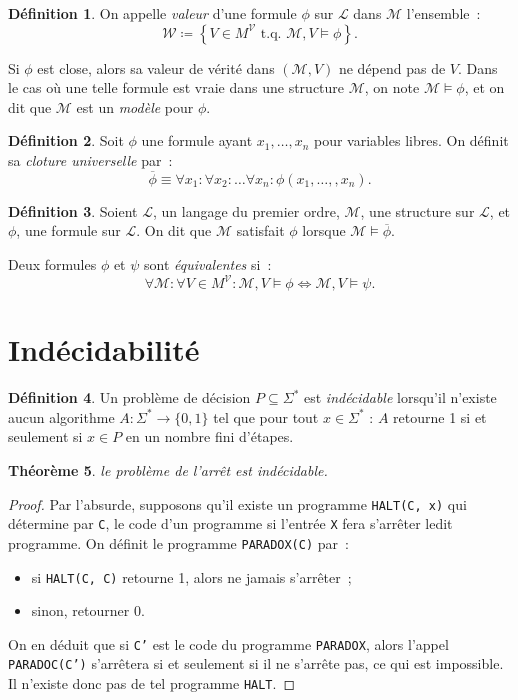 \documentclass{article}
\newtheorem{thm}{Théorème}[section]
\theoremstyle{definition}
\newtheorem{déf}[thm]{Définition}
\theoremstyle{remark}
\newcommand{\tq}{\text{ t.q. }}
\begin{document}
	\begin{déf} On appelle \textit{valeur} d'une formule $\phi$ sur $\mathcal L$ dans $\mathcal M$ l'ensemble~:
	\[\mathcal W \coloneqq \left\{V \in M^{\mathcal V} \tq \mathcal M,V \models \phi\right\}.\]
	\end{déf}

	Si $\phi$ est close, alors sa valeur de vérité dans $(\mathcal M, V)$ ne dépend pas de $V$. Dans le cas où une telle formule est vraie dans
	une structure $\mathcal M$, on note $\mathcal M \models \phi$, et on dit que $\mathcal M$ est un \textit{modèle} pour $\phi$.

	\begin{déf} Soit $\phi$ une formule ayant $x_1, \ldots, x_n$ pour variables libres. On définit sa \textit{cloture universelle} par~:
	\[\overline \phi \equiv \forall x_1 : \forall x_2 : \ldots \forall x_n : \phi(x_1, \ldots, ,x_n).\]
	\end{déf}

	\begin{déf} Soient $\mathcal L$, un langage du premier ordre, $\mathcal M$, une structure sur $\mathcal L$, et $\phi$, une formule sur $\mathcal L$.
	On dit que $\mathcal M$ satisfait $\phi$ lorsque $\mathcal M \models \overline \phi$.

	Deux formules $\phi$ et $\psi$ sont \textit{équivalentes} si~:
	\[\forall \mathcal M : \forall V \in M^{\mathcal V} : \mathcal M,V \models \phi \Leftrightarrow \mathcal M,V \models \psi.\]
	\end{déf}

\section{Indécidabilité}
	\begin{déf} Un problème de décision $P \subseteq \Sigma^*$ est \textit{indécidable} lorsqu'il n'existe aucun algorithme $A : \Sigma^* \to \{0, 1\}$
	tel que pour tout $x \in \Sigma^*$ : $A$ retourne 1 si et seulement si $x \in P$ en un nombre fini d'étapes.
	\end{déf}

	\begin{thm} le problème de l'arrêt est indécidable.
	\end{thm}

	\begin{proof} Par l'absurde, supposons qu'il existe un programme \texttt{HALT(C, x)} qui détermine par \texttt{C}, le code d'un programme si l'entrée
	\texttt{X} fera s'arrêter ledit programme. On définit le programme \texttt{PARADOX(C)} par~:
	\begin{itemize}
		\item si \texttt{HALT(C, C)} retourne 1, alors ne jamais s'arrêter~;
		\item sinon, retourner 0.
	\end{itemize}

	On en déduit que si \texttt{C'} est le code du programme \texttt{PARADOX}, alors l'appel \texttt{PARADOC(C')} s'arrêtera si et seulement si il
	ne s'arrête pas, ce qui est impossible. Il n'existe donc pas de tel programme \texttt{HALT}.
	\end{proof}
\end{document}
